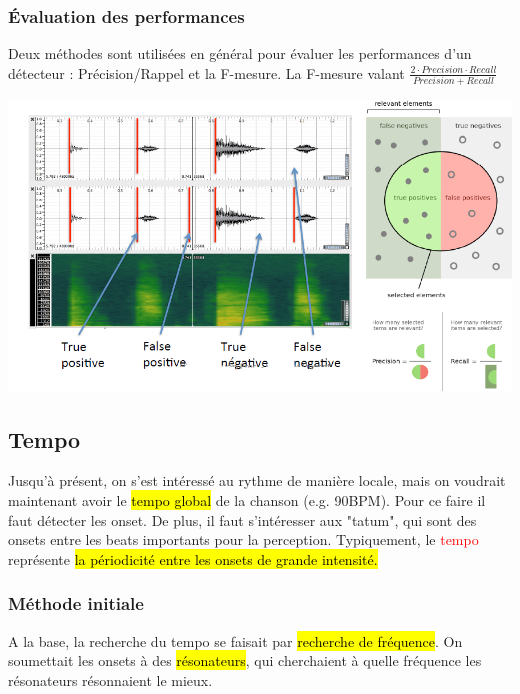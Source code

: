 \documentclass[letterpaper, 12pt]{article}
\newcommand{\alinea}{
\hspace*{0.5cm}}
\newcommand{\red}[1]{
	\textcolor{red}{#1}}
\begin{document}
			\subsubsection{\'Evaluation des performances}
				\alinea Deux méthodes sont utilisées en général pour évaluer les performances d'un détecteur : Précision/Rappel et la 
					F-mesure. La F-mesure valant $\frac{2 \cdot Precision \cdot Recall}{Precision + Recall}$
				\begin{center}
					\includegraphics[width=\textwidth]{Images/precision}
				\end{center}
		\subsection{Tempo}
			\alinea Jusqu'à présent, on s'est intéressé au rythme de manière locale, mais on voudrait maintenant avoir le \hl{tempo global} 
				de la chanson (e.g. 90BPM). Pour ce faire il faut détecter les onset. De plus, il faut s'intéresser aux "tatum", qui sont 
				des onsets entre les beats importants pour la perception. Typiquement, le \red{tempo} représente \hl{la périodicité entre 
				les onsets de grande intensité.}
			\subsubsection{Méthode initiale}
				\alinea A la base, la recherche du tempo se faisait par \hl{recherche de fréquence}. On soumettait les onsets à des
					\hl{résonateurs}, qui cherchaient à quelle fréquence les résonateurs résonnaient le mieux. 				
\end{document}

